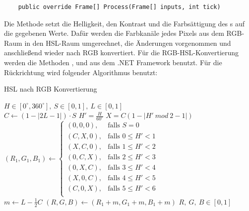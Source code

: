 \begin{itemize}
	\begin{verbatim}
	public override Frame[] Process(Frame[] inputs, int tick)
	\end{verbatim}
	Die Methode  setzt die Helligkeit, den Kontrast und die Farbsättigung des s auf die gegebenen Werte. Dafür werden die Farbkanäle jedes Pixels aus dem RGB-Raum in den HSL-Raum umgerechnet, die Änderungen vorgenommen und anschließend wieder nach RGB konvertiert. Für die RGB-HSL-Konvertierung werden die Methoden ,  und  aus dem .NET Framework benutzt. Für die Rückrichtung wird folgender Algorithmus benutzt:
	\begin{algorithm}[H]
	\caption{HSL nach RGB Konvertierung}
		\begin{algorithmic}[1]
			\REQUIRE $ H \in [0^\circ, 360^\circ], \ S \in [0, 1], \ L \in [0, 1] $ \\
			\vspace{3px}
			\STATE $ C \gets (1 - |2L - 1|) \cdot S $
			\STATE $ H' = \frac{H}{60^\circ} $
			\STATE $ X = C(1 - |H' \ mod \ 2 - 1|) $
			\vspace{3px}
			\STATE $ (R_1, G_1, B_1) \gets
					\begin{cases} 
						(0, 0, 0), & \text{falls } S = 0 \\
						(C, X, 0), & \text{falls } 0 \leq H' < 1 \\
						(X, C, 0), & \text{falls } 1 \leq H' < 2 \\
						(0, C, X), & \text{falls } 2 \leq H' < 3 \\
						(0, X, C), & \text{falls } 3 \leq H' < 4 \\
						(X, 0, C), & \text{falls } 4 \leq H' < 5 \\
						(C, 0, X), & \text{falls } 5 \leq H' < 6 \\
					\end{cases}
				   $
			\vspace{3px} \\
			\vspace{3px}
			\STATE $ m \gets L - \frac{1}{2}C $
			\STATE $ (R, G, B) \gets (R_1 + m, G_1 + m, B_1 + m) $
			\vspace{3px}
			\ENSURE $ R, \ G, \ B \in [0, 1] $ \\
		\end{algorithmic}
	\end{algorithm}
	

\end{itemize}
